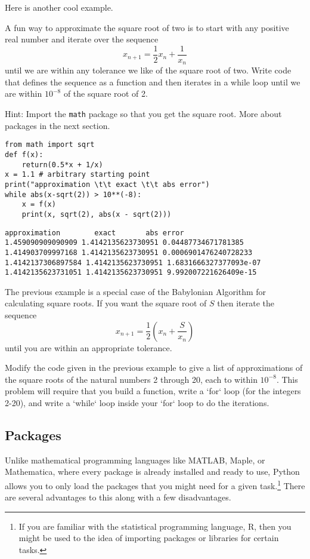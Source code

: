 \begin{example}
    Here is another cool example.

A fun way to approximate the square root of two is to start with any positive real number
and iterate over the sequence 
$$x_{n+1} = \frac{1}{2} x_n + \frac{1}{x_n}$$ 
until we are
within any tolerance we like of the square root of two.  Write code that defines the
sequence as a function and then iterates in a while loop until we are within $10^{-8}$ of
the square root of 2.  

Hint: Import the \texttt{math} package so that you get the square root.  More about
packages in the next section.

\bcode
\begin{lstlisting}
from math import sqrt
def f(x):
    return(0.5*x + 1/x)
x = 1.1 # arbitrary starting point
print("approximation \t\t exact \t\t abs error")
while abs(x-sqrt(2)) > 10**(-8):
    x = f(x)
    print(x, sqrt(2), abs(x - sqrt(2)))
\end{lstlisting}
\boutput
\begin{lstlisting}
approximation 		 exact 		 abs error
1.459090909090909 1.4142135623730951 0.04487734671781385
1.414903709997168 1.4142135623730951 0.0006901476240728233
1.4142137306897584 1.4142135623730951 1.6831666327377093e-07
1.4142135623731051 1.4142135623730951 9.992007221626409e-15
\end{lstlisting}
\end{example}

\begin{problem}
    The previous example is a special case of the Babylonian Algorithm for calculating square roots.  If you want the square root of $S$ then iterate the sequence
$$x_{n+1} = \frac{1}{2} \left( x_n + \frac{S}{x_n} \right)$$
until you are within an appropriate tolerance.

Modify the code given in the previous example to give a list of approximations of the square roots of the natural numbers 2 through 20, each to within $10^{-8}$.  This problem will require that you build a function, write a `for` loop (for the integers 2-20), and write a `while` loop inside your `for` loop to do the iterations.
\end{problem}



\subsection{Packages}
Unlike mathematical programming languages like MATLAB, Maple, or Mathematica, where every
package is already installed and ready to use, Python allows you to only load the packages
that you might need for a given task.\footnote{If you are familiar with the statistical
    programming language, R, then you might be used to the idea of importing packages or
libraries for certain tasks.}  There are several advantages to this along with a
few disadvantages.

